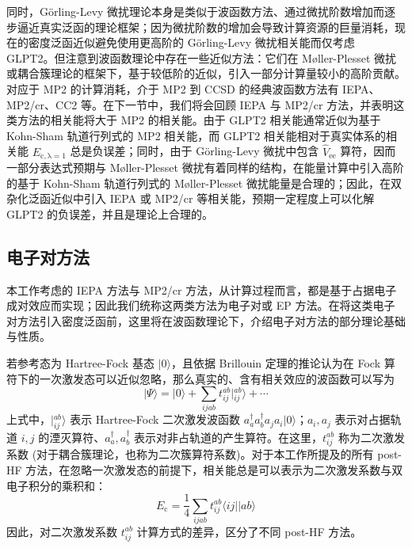 同时，G\"orling-Levy 微扰理论本身是类似于波函数方法、通过微扰阶数增加而逐步逼近真实泛函的理论框架；因为微扰阶数的增加会导致计算资源的巨量消耗，现在的密度泛函近似避免使用更高阶的 G\"orling-Levy 微扰相关能而仅考虑 GLPT2。但注意到波函数理论中存在一些近似方法：它们在 M\o{}ller-Plesset 微扰或耦合簇理论的框架下，基于较低阶的近似，引入一部分计算量较小的高阶贡献。对应于 MP2 的计算消耗，介于 MP2 到 CCSD 的经典波函数方法有 IEPA\cite{Sinanoǧlu-Sinanoǧlu.ACP.1964, Nesbet-Nesbet.ACP.1965}、MP2/cr\cite{Dykstra-Davidson.IJQC.2000}、CC2\cite{Christiansen-Joergensen.CPL.1995} 等。在下一节中，我们将会回顾 IEPA 与 MP2/cr 方法，并表明这类方法的相关能将大于 MP2 的相关能。由于 GLPT2 相关能通常近似为基于 Kohn-Sham 轨道行列式的 MP2 相关能，而 GLPT2 相关能相对于真实体系的相关能 $E_\mathrm{c, \lambda=1}$ 总是负误差；同时，由于 G\"orling-Levy 微扰中包含 $\hat V_\mathrm{ee}$ 算符，因而一部分表达式预期与 M\o{}ller-Plesset 微扰有着同样的结构，在能量计算中引入高阶的基于 Kohn-Sham 轨道行列式的 M\o{}ller-Plesset 微扰能量是合理的；因此，在双杂化泛函近似中引入 IEPA 或 MP2/cr 等相关能，预期一定程度上可以化解 GLPT2 的负误差，并且是理论上合理的。

\subsection{电子对方法}
\label{sec.3.ep}

本工作考虑的 IEPA 方法与 MP2/cr 方法，从计算过程而言，都是基于占据电子成对效应而实现；因此我们统称这两类方法为电子对或 EP 方法。在将这类电子对方法引入密度泛函前，这里将在波函数理论下，介绍电子对方法的部分理论基础与性质。

若参考态为 Hartree-Fock 基态 $| 0 \rangle$，且依据 Brillouin 定理的推论认为在 Fock 算符下的一次激发态可以近似忽略，那么真实的、含有相关效应的波函数可以写为
\begin{equation}
  | \Psi \rangle = | 0 \rangle + \sum_{ijab} t_{ij}^{ab} | {}_{ij}^{ab} \rangle + \cdots
\end{equation}
上式中，$| {}_{ij}^{ab} \rangle$ 表示 Hartree-Fock 二次激发波函数 $a_a^\dagger a_b^\dagger a_j a_i | 0 \rangle$；$a_i, a_j$ 表示对占据轨道 $i, j$ 的湮灭算符、$a_a^\dagger, a_b^\dagger$ 表示对非占轨道的产生算符。在这里，$t_{ij}^{ab}$ 称为二次激发系数 (对于耦合簇理论，也称为二次簇算符系数)。对于本工作所提及的所有 post-HF 方法，在忽略一次激发态的前提下，相关能总是可以表示为二次激发系数与双电子积分的乘积和：
\begin{equation}
  E_\mathrm{c} = \frac{1}{4} \sum_{ijab} t_{ij}^{ab} \langle ij || ab \rangle
\end{equation}
因此，对二次激发系数 $t_{ij}^{ab}$ 计算方式的差异，区分了不同 post-HF 方法。

